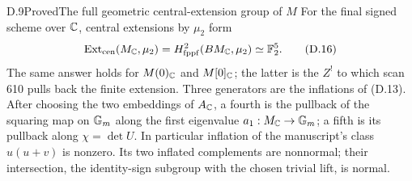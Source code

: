 \begin{statement}{D.9}{Proved}{The full geometric central-extension group of \(M\)}
For the final signed scheme over \(\mathbb C\), central extensions
by \(\mu _2\) form
\[
 \operatorname{Ext}_{\mathrm{cen}}(M_\mathbb C,\mu _2)
   =H^2_{\mathrm{fppf}}(BM_\mathbb C,\mu _2)
   \simeq\mathbb F_2^5.                                             \tag{D.16}
\]
The same answer holds for \(M(0)_\mathbb C\) and \(M[0]_\mathbb C\);
the latter is the \(Z^!\) to which scan 610 pulls back
the finite extension.
Three generators are the inflations of (D.13).
After choosing the two embeddings of \(A_\mathbb C\), a fourth is the
pullback of the squaring map on \(\mathbb G_m\) along the first
eigenvalue \(a_1:M_\mathbb C\to\mathbb G_m\); a fifth is its pullback along
\(\chi=\det U\).
In particular inflation of the manuscript's class \(u(u+v)\)
is nonzero.  Its two inflated complements are nonnormal;
their intersection, the identity-sign subgroup with the chosen
trivial lift, is normal.
\end{statement}
